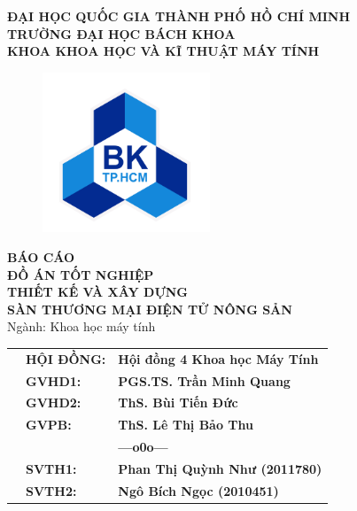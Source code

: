 \documentclass[12pt, a4paper]{report}
\theoremstyle{definition}
\begin{document}
\begin{titlepage}

\begin{center}
\large \textbf{ĐẠI HỌC QUỐC GIA THÀNH PHỐ HỒ CHÍ MINH} \\
\large \textbf{TRƯỜNG ĐẠI HỌC BÁCH KHOA} \\
\large \textbf{KHOA KHOA HỌC VÀ KĨ THUẬT MÁY TÍNH}
\end{center}

\begin{figure}[h!]
\begin{center}
\includegraphics[width=5cm]{Images/hcmut.png}
\end{center}
\end{figure}

\begin{center}
{\textbf{{\Large BÁO CÁO}}}\\
{\textbf{{\Large ĐỒ ÁN TỐT NGHIỆP}}}\\
\vspace{1cm}
\textbf{\LARGE THIẾT KẾ VÀ XÂY DỰNG}\\
\textbf{\LARGE SÀN THƯƠNG MẠI ĐIỆN TỬ NÔNG SẢN}\\
\vspace{0.5cm}
{\Large Ngành: Khoa học máy tính}\\
\end{center}

\vspace{1cm}
\begin{table}[h]
\begin{tabular}{rll}
\hspace{3.8cm} 
& \textbf{\Large HỘI ĐỒNG:} & \textbf{\Large Hội đồng 4 Khoa học Máy Tính}\\
& \textbf{\Large GVHD1:} & \textbf{\Large PGS.TS. Trần Minh Quang}\\
& \textbf{\Large GVHD2:} & \textbf{\Large ThS. Bùi Tiến Đức}\\
& \textbf{\Large GVPB:} & \textbf{\Large ThS. Lê Thị Bảo Thu }\\
&                   &\textbf{---o0o---} \\
& \textbf{\Large SVTH1:} & \textbf{\Large Phan Thị Quỳnh Như (2011780)}\\
& \textbf{\Large SVTH2:} & \textbf{\Large Ngô Bích Ngọc (2010451)}


\end{tabular}
\end{table}
\end{titlepage}
\end{document}
